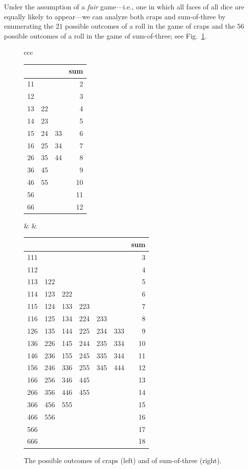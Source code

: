 Under the assumption of a {\em fair} game---i.e., one in which all
faces of all dice are equally likely to appear---we can analyze both
craps and sum-of-three by enumerating the $21$ possible outcomes of a
roll in the game of craps and the $56$ possible outcomes of a roll in
the game of sum-of-three; see Fig.~\ref{fig:dice-outcomes}.
\begin{figure}[htb]
\begin{center}
\begin{tabular}{ccc}
\begin{tabular}{|c|c|c|r|}
\hline
   &    &    & sum \\
\hline
11 &    &    & 2 \\
12 &    &    & 3 \\
13 & 22 &    & 4 \\
14 & 23 &    & 5 \\
15 & 24 & 33 & 6 \\
16 & 25 & 34 & 7 \\
26 & 35 & 44 & 8 \\
36 & 45 &    & 9 \\
46 & 55 &    & 10 \\
56 &    &    & 11 \\
66 &    &    & 12 \\
\hline
\end{tabular}
  &
\hspace*{.5in}
  &
\begin{tabular}{|c|c|c|c|c|c|r|}
\hline
 & & & & & & sum\\
\hline
111 & & & & & & 3\\
112 & & & & & & 4\\
113 & 122 & & & & & 5 \\
114 & 123 & 222 & & & & 6 \\
115 & 124 & 133 & 223 & & & 7\\
116 & 125 & 134 &  224 & 233 & & 8\\
126 & 135 & 144 & 225 & 234 & 333 & 9\\
136 &  226 & 145 & 244 & 235 & 334 & 10\\
146 & 236 & 155 & 245 & 335 & 344 & 11\\
156 & 246 & 336 & 255 & 345 & 444 & 12\\
166 & 256 & 346 & 445 & & & 13\\
266 & 356 & 446 & 455 & & & 14\\
366 & 456 & 555 & & & & 15\\
466 & 556 & & & & & 16\\
566 & & & & & & 17\\
666 & & & & & & 18\\
\hline
\end{tabular}
\end{tabular}
\end{center}
\caption{The possible outcomes of craps (left) and of sum-of-three (right).}
\label{fig:dice-outcomes}
\end{figure}

